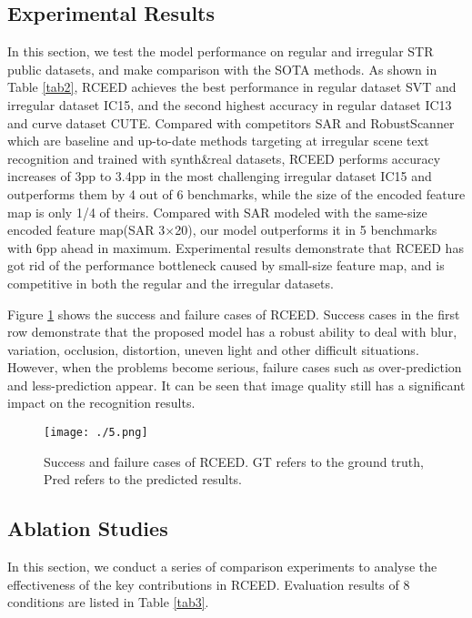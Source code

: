 \documentclass[runningheads]{llncs}
\begin{document}
\subsection{Experimental Results}
In this section, we test the model performance on regular and irregular STR public datasets, and make comparison with the SOTA methods. As shown in Table \ref{tab2}, RCEED achieves the best performance in regular dataset SVT and irregular dataset IC15, and the second highest accuracy in regular dataset IC13 and curve dataset CUTE. Compared with competitors SAR\cite{li2019show} and RobustScanner\cite{yue2020robustscanner} which are baseline and up-to-date methods targeting at irregular scene text recognition and trained with synth\&real datasets, RCEED performs accuracy increases of 3pp to 3.4pp in the most challenging irregular dataset IC15 and outperforms them by 4 out of 6 benchmarks, while the size of the encoded feature map is only 1/4 of theirs. Compared with SAR modeled with the same-size encoded feature map(SAR 3$\times$20), our model outperforms it in 5 benchmarks with 6pp ahead in maximum. Experimental results demonstrate that RCEED has got rid of the performance bottleneck caused by small-size feature map, and is competitive in both the regular and the irregular datasets.

Figure \ref{Fig.5} shows the success and failure cases of RCEED. Success cases in the first row demonstrate that the proposed model has a robust ability to deal with blur, variation, occlusion, distortion, uneven light and other difficult situations. However, when the problems become serious, failure cases such as over-prediction and less-prediction appear. It can be seen that image quality still has a significant impact on the recognition results.

\begin{figure}
\vspace{-0.3cm} 
\setlength{\belowcaptionskip}{-0.5cm} 
\centering
\texttt{[image: ./5.png]}
\caption{Success and failure cases of RCEED. GT refers to the ground truth, Pred refers to the predicted results. } 
\label{Fig.5}
\end{figure}

\subsection{Ablation Studies}
In this section, we conduct a series of comparison experiments to analyse the effectiveness of the key contributions in RCEED. Evaluation results of 8 conditions are listed in Table \ref{tab3}.
\end{document}
